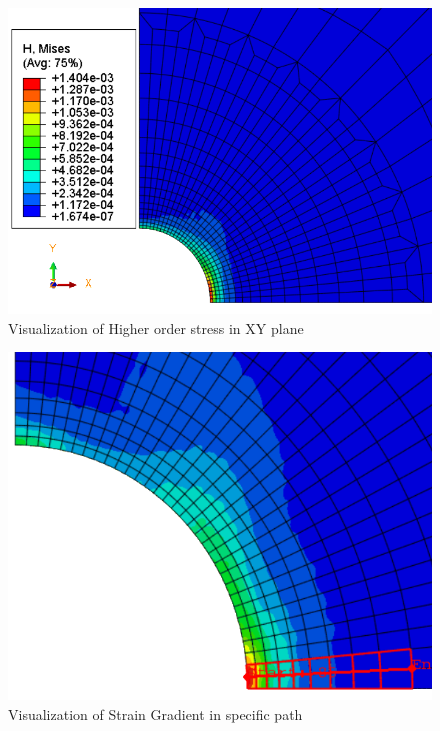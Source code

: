 \documentclass[12pt]{article}
\begin{document}
\begin{figure}[H]
	\begin{center}
		\includegraphics[scale=0.8]{Higher_order_stress_crop.png} 
	\end{center}  
	\caption{Visualization of Higher order stress in XY plane}
\end{figure}
\begin{figure}[H]
	\begin{center}
		\includegraphics[scale=1.2]{path_full_grad_crop.png} 
	\end{center}  
	\caption{Visualization of Strain Gradient in specific path}
\end{figure}
\end{document}
